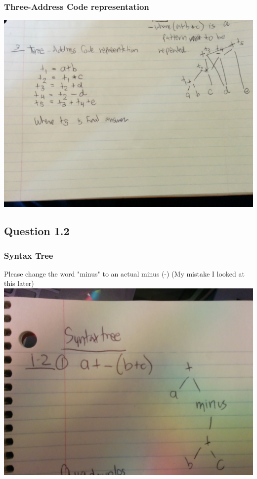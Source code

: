 \documentclass[11pt, oneside]{article}   	%
\begin{document}
\subsubsection{Three-Address Code representation}
\includegraphics[scale=0.15]{IMG_20141025_154609.jpg}

\subsection{Question 1.2}

\subsubsection{Syntax Tree}
\par Please change the word "minus" to an actual minus (-) (My mistake I looked at this later) \\
\includegraphics[scale=0.15]{IMG_20141028_235513.jpg}
\end{document}
